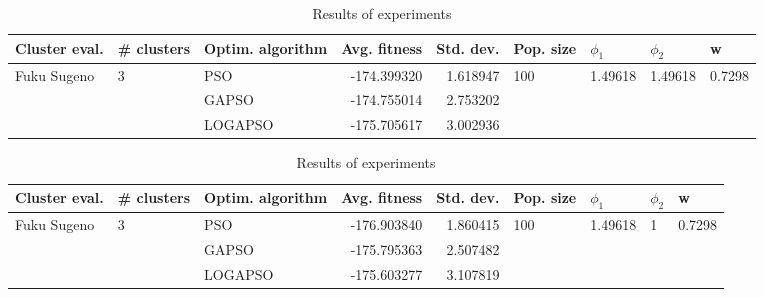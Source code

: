 \documentclass{article}
\begin{document}
\begin{table}
\centering
\caption{Results of experiments}
\begin{tabular}{lllrrllll}
\toprule
               Cluster eval. &        \# clusters & Optim. algorithm &  Avg. fitness &  Std. dev. &            Pop. size &               $\phi_{1}$ &               $\phi_{2}$ &                       w \\
\midrule
\multirow{3}{*}{Fuku Sugeno} & \multirow{3}{*}{3} &              PSO &   -174.399320 &   1.618947 & \multirow{3}{*}{100} & \multirow{3}{*}{1.49618} & \multirow{3}{*}{1.49618} & \multirow{3}{*}{0.7298} \\
                             &                    &            GAPSO &   -174.755014 &   2.753202 &                      &                          &                          &                         \\
                             &                    &          LOGAPSO &   -175.705617 &   3.002936 &                      &                          &                          &                         \\
\bottomrule
\end{tabular}
\end{table}
\begin{table}
\centering
\caption{Results of experiments}
\begin{tabular}{lllrrllll}
\toprule
               Cluster eval. &        \# clusters & Optim. algorithm &  Avg. fitness &  Std. dev. &            Pop. size &               $\phi_{1}$ &         $\phi_{2}$ &                       w \\
\midrule
\multirow{3}{*}{Fuku Sugeno} & \multirow{3}{*}{3} &              PSO &   -176.903840 &   1.860415 & \multirow{3}{*}{100} & \multirow{3}{*}{1.49618} & \multirow{3}{*}{1} & \multirow{3}{*}{0.7298} \\
                             &                    &            GAPSO &   -175.795363 &   2.507482 &                      &                          &                    &                         \\
                             &                    &          LOGAPSO &   -175.603277 &   3.107819 &                      &                          &                    &                         \\
\bottomrule
\end{tabular}
\end{table}
\end{document}

